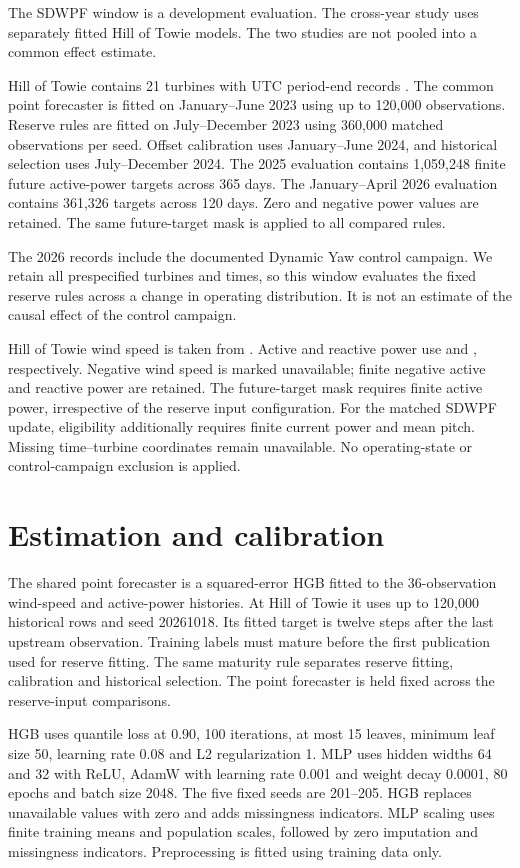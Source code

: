 The SDWPF window is a development evaluation. The cross-year study uses separately fitted Hill of Towie models. The two studies are not pooled into a common effect estimate.

Hill of Towie contains 21 turbines with UTC period-end records \cite{clerc2026towie}. The common point forecaster is fitted on January--June 2023 using up to 120,000 observations. Reserve rules are fitted on July--December 2023 using 360,000 matched observations per seed. Offset calibration uses January--June 2024, and historical selection uses July--December 2024. The 2025 evaluation contains 1,059,248 finite future active-power targets across 365 days. The January--April 2026 evaluation contains 361,326 targets across 120 days. Zero and negative power values are retained. The same future-target mask is applied to all compared rules.

The 2026 records include the documented Dynamic Yaw control campaign. We retain all prespecified turbines and times, so this window evaluates the fixed reserve rules across a change in operating distribution. It is not an estimate of the causal effect of the control campaign.

Hill of Towie wind speed is taken from . Active and reactive power use  and , respectively. Negative wind speed is marked unavailable; finite negative active and reactive power are retained. The future-target mask requires finite active power, irrespective of the reserve input configuration. For the matched SDWPF update, eligibility additionally requires finite current power and mean pitch. Missing time--turbine coordinates remain unavailable. No operating-state or control-campaign exclusion is applied.

\section{Estimation and calibration}
The shared point forecaster is a squared-error HGB fitted to the 36-observation wind-speed and active-power histories. At Hill of Towie it uses up to 120,000 historical rows and seed 20261018. Its fitted target is twelve steps after the last upstream observation. Training labels must mature before the first publication used for reserve fitting. The same maturity rule separates reserve fitting, calibration and historical selection. The point forecaster is held fixed across the reserve-input comparisons.

HGB uses quantile loss at 0.90, 100 iterations, at most 15 leaves, minimum leaf size 50, learning rate 0.08 and L2 regularization 1. MLP uses hidden widths 64 and 32 with ReLU, AdamW with learning rate 0.001 and weight decay 0.0001, 80 epochs and batch size 2048. The five fixed seeds are 201--205. HGB replaces unavailable values with zero and adds missingness indicators. MLP scaling uses finite training means and population scales, followed by zero imputation and missingness indicators. Preprocessing is fitted using training data only.

